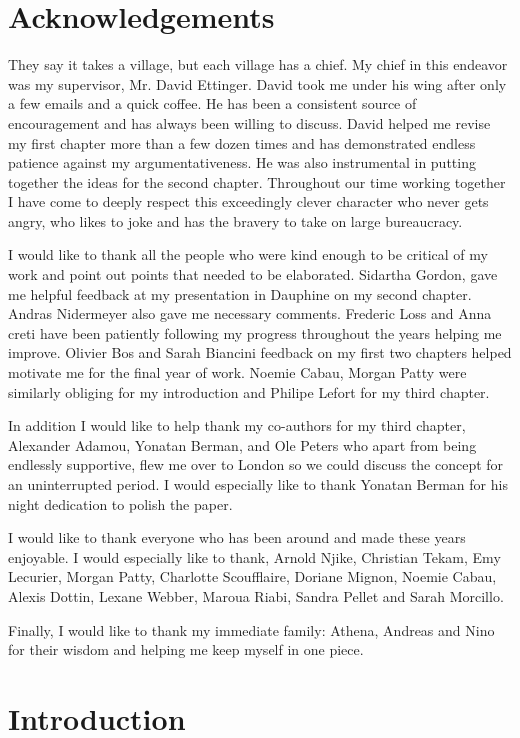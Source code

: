 \documentclass[12pt,twoside]{report}
\makeatletter
\numberwithin{equation}{section}
\newcommand{\chapterauthor}[1]{%
  {\parindent0pt\vspace*{-25pt}%
  \linespread{1.1}\large\scshape#1%
  \par\nobreak\vspace*{35pt}}
  \@afterheading%
}
\makeatother
\begin{document}
 
\chapter*{Acknowledgements}
They say it takes a village, but each village has a chief. My chief in this endeavor was my supervisor, Mr. David Ettinger. David took me under his wing after only a few emails and a quick coffee. He has been a consistent source of encouragement and has always been willing to discuss. David helped me revise my first chapter more than a few dozen times and has demonstrated endless patience against my argumentativeness. He was also instrumental in putting together the ideas for the second chapter. Throughout our time working together I have come to deeply respect this exceedingly clever character who never gets angry, who likes to joke and has the bravery to take on large bureaucracy.

I would like to thank all the people who were kind enough to be critical of my work and point out points that needed to be elaborated. Sidartha Gordon, gave me helpful feedback at my presentation in Dauphine on my second chapter. Andras Nidermeyer also gave me necessary comments. Frederic Loss and Anna creti have been patiently following my progress throughout the years helping me improve. Olivier Bos and Sarah Biancini feedback on my first two chapters helped motivate me for the final year of work. Noemie Cabau, Morgan Patty were similarly obliging for my introduction and Philipe Lefort for my third chapter. 

In addition I would like to help thank my co-authors for my third chapter, Alexander Adamou, Yonatan Berman, and Ole Peters who apart from being endlessly supportive, flew me over to London so we could discuss the concept for an uninterrupted period. I would especially like to thank Yonatan Berman for his night dedication to polish the paper.

I would like to thank everyone who has been around and made these years enjoyable. I would especially like to thank, Arnold Njike, Christian Tekam, Emy Lecurier, Morgan Patty, Charlotte Scoufflaire, Doriane Mignon, Noemie Cabau, Alexis Dottin, Lexane Webber, Maroua Riabi, Sandra Pellet and Sarah Morcillo. 

Finally, I would like to thank my immediate family: Athena, Andreas and Nino for their wisdom and helping me keep myself in one piece.
\chapter*{Introduction}

\end{document}
